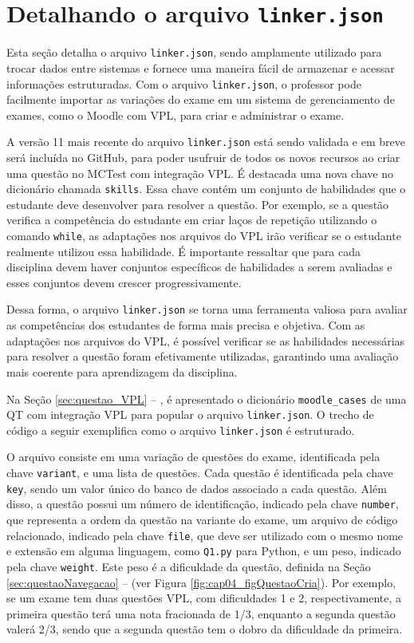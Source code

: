 \section{Detalhando o arquivo \texttt{linker.json}}

Esta seção detalha o arquivo \verb|linker.json|, sendo amplamente utilizado para trocar dados entre sistemas e fornece uma maneira fácil de armazenar e acessar informações estruturadas. Com o arquivo \verb|linker.json|, o professor pode facilmente importar as variações do exame em um sistema de gerenciamento de exames, como o Moodle com VPL, para criar e administrar o exame.

A versão 11 mais recente do arquivo \verb|linker.json| está sendo validada e em breve será incluída no GitHub, para poder usufruir de todos os novos recursos ao criar uma questão no MCTest com integração VPL. É destacada uma nova chave no dicionário chamada \verb|skills|. Essa chave contém um conjunto de habilidades que o estudante deve desenvolver para resolver a questão. Por exemplo, se a questão verifica a competência do estudante em criar laços de repetição utilizando o comando \verb|while|, as adaptações nos arquivos do VPL irão verificar se o estudante realmente utilizou essa habilidade. É importante ressaltar que para cada disciplina devem haver conjuntos específicos de habilidades a serem avaliadas e esses conjuntos devem crescer progressivamente.

Dessa forma, o arquivo \verb|linker.json| se torna uma ferramenta valiosa para avaliar as competências dos estudantes de forma mais precisa e objetiva. Com as adaptações nos arquivos do VPL, é possível verificar se as habilidades necessárias para resolver a questão foram efetivamente utilizadas, garantindo uma avaliação mais coerente para aprendizagem da disciplina.

Na Seção \ref{sec:questao_VPL} -- , é apresentado o dicionário \verb|moodle_cases| de uma QT com integração VPL para popular o arquivo \verb|linker.json|. O trecho de código a seguir exemplifica como o arquivo \verb|linker.json| é estruturado.

O arquivo consiste em uma variação de questões do exame, identificada pela chave \verb|variant|, e uma lista de questões. Cada questão é identificada pela chave \verb|key|, sendo um valor único do banco de dados associado a cada questão. Além disso, a questão possui um número de identificação, indicado pela chave \verb|number|, que representa a ordem da questão na variante do exame, um arquivo de código relacionado, indicado pela chave \verb|file|, que deve ser utilizado com o mesmo nome e extensão em alguma linguagem, como \verb|Q1.py| para Python, e um peso, indicado pela chave \verb|weight|. Este peso é a dificuldade da questão, definida na Seção \ref{sec:questaoNavegacao} --  (ver Figura \ref{fig:cap04_figQuestaoCria}). Por exemplo, se um exame tem duas questões VPL, com dificuldades 1 e 2, respectivamente, a primeira questão terá uma nota fracionada de 1/3, enquanto a segunda questão valerá 2/3, sendo que a segunda questão tem o dobro da dificuldade da primeira.

